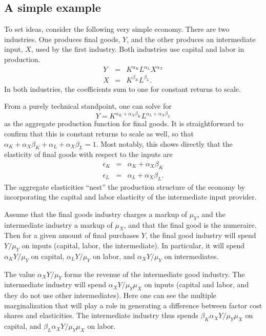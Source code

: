 \documentclass[11pt]{article}
\begin{document}
\subsection{A simple example}
To set ideas, consider the following very simple economy. There are two industries. One produces final goods, $Y$, and the other produces an intermediate input, $X$, used by the first industry. Both industries use capital and labor in production. 
\begin{eqnarray}
	Y &=& K^{\alpha_K} L^{\alpha_L} X^{\alpha_X} \\
	X &=& K^{\beta_K} L^{\beta_L}.
\end{eqnarray}
In both industries, the coefficients sum to one for constant returns to scale. 

From a purely technical standpoint, one can solve for
\begin{equation}
	Y = K^{\alpha_K + \alpha_X \beta_K} L^{\alpha_L + \alpha_X \beta_L}
\end{equation}
as the aggregate production function for final goods. It is straightforward to confirm that this is constant returns to scale as well, so that $\alpha_K + \alpha_X \beta_K + \alpha_L + \alpha_X \beta_L = 1$. Most notably, this shows directly that the elasticity of final goods with respect to the inputs are
\begin{eqnarray}
	\epsilon_K &=& \alpha_K + \alpha_X \beta_K \\
	\epsilon_L &=& \alpha_L + \alpha_X \beta_L. 
\end{eqnarray}
The aggregate elasticities ``nest'' the production structure of the economy by incorporating the capital and labor elasticity of the intermediate input provider.

Assume that the final goods industry charges a markup of $\mu_Y$, and the intermediate industry a markup of $\mu_X$, and that the final good is the numeraire. Then for a given amount of final purchases $Y$, the final good industry will spend $Y/\mu_Y$ on inputs (capital, labor, the intermediate). In particular, it will spend $\alpha_K Y/\mu_Y$ on capital, $\alpha_L Y/\mu_Y$ on labor, and $\alpha_X Y/\mu_Y$ on intermediates. 

The value $\alpha_X Y/\mu_Y$ forms the revenue of the intermediate good industry. The intermediate industry will spend $\alpha_X Y/\mu_Y \mu_X$ on inputs (capital and labor, and they do not use other intermediates). Here one can see the multiple marginalization that will play a role in generating a difference between factor cost shares and elasticities. The intermediate industry thus spends $\beta_K \alpha_X Y/\mu_Y \mu_X$ on capital, and $\beta_L \alpha_X Y/\mu_Y \mu_X$ on labor. 
\end{document}
